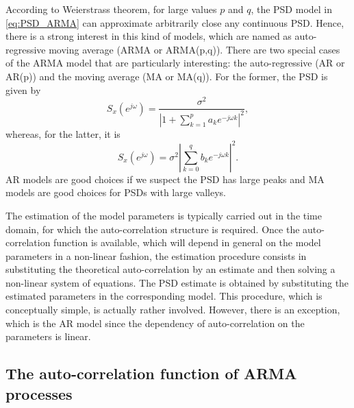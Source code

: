 According to Weierstrass theorem, for large values $p$ and $q$, the PSD model in \eqref{eq:PSD_ARMA} can approximate arbitrarily close any continuous PSD. Hence, there is a strong interest in this kind of models, which are named as auto-regressive moving average (ARMA or ARMA(p,q)). There are two special cases of the ARMA model that are particularly interesting: the auto-regressive (AR or AR(p)) and the moving average (MA or MA(q)). For the former, the PSD is given by
\begin{equation*}
S_x(e^{j \omega}) = \frac{\sigma^2}{\displaystyle \left|1 + \sum_{k = 1}^{p} a_k e^{-j \omega k}\right|^2},
\end{equation*}
whereas, for the latter, it is
\begin{equation*}
S_x(e^{j \omega}) =  \sigma^2 \left|\sum_{k = 0}^{q} b_k e^{-j \omega k}\right|^2.
\end{equation*}
AR models are good choices if we suspect the PSD has large peaks and MA models are good choices for PSDs with large valleys.

The estimation of the model parameters is typically carried out in the time domain, for which the auto-correlation structure is required. Once the auto-correlation function is available, which will depend in general on the model parameters in a non-linear fashion, the estimation procedure consists in substituting the theoretical auto-correlation by an estimate and then solving a non-linear system of equations. The PSD estimate is obtained by substituting the estimated parameters in the corresponding model. This procedure, which is conceptually simple, is actually rather involved. However, there is an exception, which is the AR model since the dependency of auto-correlation on the parameters is linear.

\subsection{The auto-correlation function of ARMA processes}

